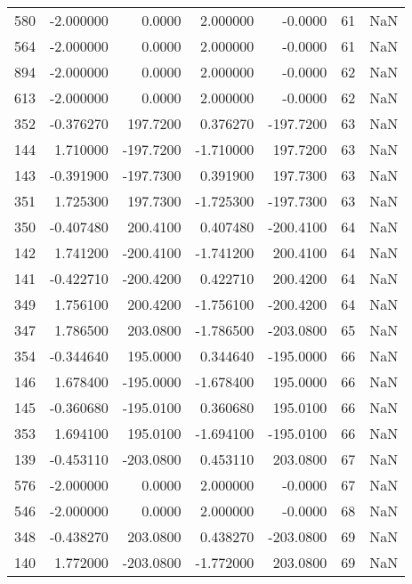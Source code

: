 \begin{tabular}{rrrrrrr}
 580 &   -2.000000 &    0.0000 &    2.000000 &     -0.0000 &          61 & NaN \\
 564 &   -2.000000 &    0.0000 &    2.000000 &     -0.0000 &          61 & NaN \\
 894 &   -2.000000 &    0.0000 &    2.000000 &     -0.0000 &          62 & NaN \\
 613 &   -2.000000 &    0.0000 &    2.000000 &     -0.0000 &          62 & NaN \\
 352 &   -0.376270 &  197.7200 &    0.376270 &   -197.7200 &          63 & NaN \\
 144 &    1.710000 & -197.7200 &   -1.710000 &    197.7200 &          63 & NaN \\
 143 &   -0.391900 & -197.7300 &    0.391900 &    197.7300 &          63 & NaN \\
 351 &    1.725300 &  197.7300 &   -1.725300 &   -197.7300 &          63 & NaN \\
 350 &   -0.407480 &  200.4100 &    0.407480 &   -200.4100 &          64 & NaN \\
 142 &    1.741200 & -200.4100 &   -1.741200 &    200.4100 &          64 & NaN \\
 141 &   -0.422710 & -200.4200 &    0.422710 &    200.4200 &          64 & NaN \\
 349 &    1.756100 &  200.4200 &   -1.756100 &   -200.4200 &          64 & NaN \\
 347 &    1.786500 &  203.0800 &   -1.786500 &   -203.0800 &          65 & NaN \\
 354 &   -0.344640 &  195.0000 &    0.344640 &   -195.0000 &          66 & NaN \\
 146 &    1.678400 & -195.0000 &   -1.678400 &    195.0000 &          66 & NaN \\
 145 &   -0.360680 & -195.0100 &    0.360680 &    195.0100 &          66 & NaN \\
 353 &    1.694100 &  195.0100 &   -1.694100 &   -195.0100 &          66 & NaN \\
 139 &   -0.453110 & -203.0800 &    0.453110 &    203.0800 &          67 & NaN \\
 576 &   -2.000000 &    0.0000 &    2.000000 &     -0.0000 &          67 & NaN \\
 546 &   -2.000000 &    0.0000 &    2.000000 &     -0.0000 &          68 & NaN \\
 348 &   -0.438270 &  203.0800 &    0.438270 &   -203.0800 &          69 & NaN \\
 140 &    1.772000 & -203.0800 &   -1.772000 &    203.0800 &          69 & NaN \\

\end{tabular}
